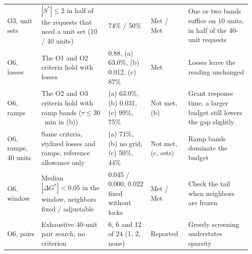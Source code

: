 \begin{tabular}{@{}p{1.45cm}p{5.2cm}p{3.5cm}p{1.55cm}p{4.0cm}@{}}
O3, unit sets & $|S^{*}|\le2$ in half of the requests that need a unit set (10 / 40 units) & 74\% / 50\% & Met / Met & One or two bands suffice on 10 units, in half of the 40-unit requests \\
O6, losses & The O1 and O2 criteria hold with losses & 0.88, (a) 63.0\%, (b) 0.012, (c) 87\% & Met & Losses leave the reading unchanged \\
O6, ramps & The O2 and O3 criteria hold with ramp bands ($\tau\le30$~min in (b)) & (a) 63.0\%, (b) 0.031, (c) 99\%, 75\% & Not met, (b) & Grant response time, a larger budget still lowers the gap slightly \\
O6, ramps, 40 units & Same criteria, stylized losses and ramps, reference allowance only & (a) 71\%, (b) no grid, (c) 50\%, 44\% & Not met, (c, sets) & Ramp bands dominate the budget \\
O6, window & Median $|\Delta G^{*}|<0.05$ in the window, neighbors fixed / adjustable & 0.045 / 0.000, 0.022 fixed without locks & Met / Met & Check the tail when neighbors are frozen \\
O6, pairs & Exhaustive 40-unit pair search, no criterion & 6, 6 and 12 of 24 (1, 2, none) & Reported & Greedy screening understates sparsity \\
\bottomrule
\end{tabular}
